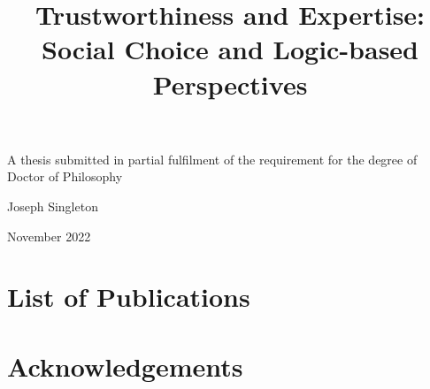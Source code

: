 \documentclass[a4paper,12pt]{memoir}
\title{
    Trustworthiness and Expertise: Social Choice and Logic-based Perspectives
}
\begin{document}
\begin{titlingpage}

    \begin{center}
        {\HUGE\bfseries \thetitle}
        \par
        \vspace{2cm}
        {\Large A thesis submitted in partial fulfilment of the requirement for
        the degree of Doctor of Philosophy}
        \par
        \vspace{2cm}
        {\LARGE Joseph Singleton}
        \par
        \vspace{10cm}
        {\Large November 2022}
    \end{center}

    \clearpage

\end{titlingpage}

\frontmatter

\begin{abstract}
    \thispagestyle{plain}
    
\end{abstract}

\newpage

\tableofcontents
\clearpage

\listoffigures
\clearpage

\listoftables
\clearpage

\chapter*{List of Publications}


\chapter*{Acknowledgements}


\mainmatter

\printbibliography
\appendix

\end{document}

